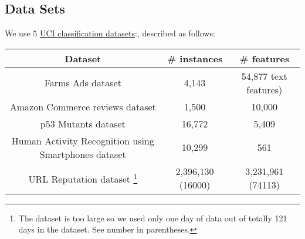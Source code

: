 
\subsection{Data Sets}


We use 5 \href{http://archive.ics.uci.edu/ml/datasets.html}{UCI classification
datasets}:, described as follows:

\begin{tabular}{| c | c |  c |}
\hline
Dataset & \# instances & \# features \\
\hline
Farms Ads dataset & 4,143 & 54,877 text features)\\
\hline
Amazon Commerce reviews dataset & 1,500 & 10,000 \\
\hline
p53 Mutants dataset & 16,772 & 5,409 \\
\hline
Human Activity Recognition using Smartphones dataset & 10,299 & 561\\
\hline
URL Reputation dataset \footnote{The dataset is too large so we used only one day of data out of totally 121 days in the dataset. See number in parentheses.} & 2,396,130 (16000) & 3,231,961 (74113) \\
\hline
\end{tabular}

